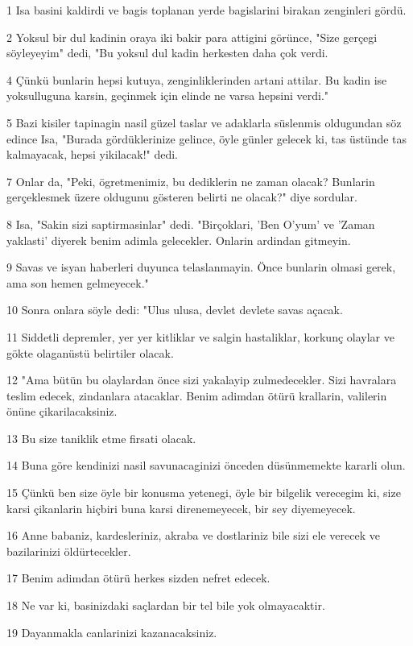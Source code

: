 \par 1 Isa basini kaldirdi ve bagis toplanan yerde bagislarini birakan zenginleri gördü.
\par 2 Yoksul bir dul kadinin oraya iki bakir para attigini görünce, "Size gerçegi söyleyeyim" dedi, "Bu yoksul dul kadin herkesten daha çok verdi.
\par 4 Çünkü bunlarin hepsi kutuya, zenginliklerinden artani attilar. Bu kadin ise yoksulluguna karsin, geçinmek için elinde ne varsa hepsini verdi."
\par 5 Bazi kisiler tapinagin nasil güzel taslar ve adaklarla süslenmis oldugundan söz edince Isa, "Burada gördüklerinize gelince, öyle günler gelecek ki, tas üstünde tas kalmayacak, hepsi yikilacak!" dedi.
\par 7 Onlar da, "Peki, ögretmenimiz, bu dediklerin ne zaman olacak? Bunlarin gerçeklesmek üzere oldugunu gösteren belirti ne olacak?" diye sordular.
\par 8 Isa, "Sakin sizi saptirmasinlar" dedi. "Birçoklari, 'Ben O'yum' ve 'Zaman yaklasti' diyerek benim adimla gelecekler. Onlarin ardindan gitmeyin.
\par 9 Savas ve isyan haberleri duyunca telaslanmayin. Önce bunlarin olmasi gerek, ama son hemen gelmeyecek."
\par 10 Sonra onlara söyle dedi: "Ulus ulusa, devlet devlete savas açacak.
\par 11 Siddetli depremler, yer yer kitliklar ve salgin hastaliklar, korkunç olaylar ve gökte olaganüstü belirtiler olacak.
\par 12 "Ama bütün bu olaylardan önce sizi yakalayip zulmedecekler. Sizi havralara teslim edecek, zindanlara atacaklar. Benim adimdan ötürü krallarin, valilerin önüne çikarilacaksiniz.
\par 13 Bu size taniklik etme firsati olacak.
\par 14 Buna göre kendinizi nasil savunacaginizi önceden düsünmemekte kararli olun.
\par 15 Çünkü ben size öyle bir konusma yetenegi, öyle bir bilgelik verecegim ki, size karsi çikanlarin hiçbiri buna karsi direnemeyecek, bir sey diyemeyecek.
\par 16 Anne babaniz, kardesleriniz, akraba ve dostlariniz bile sizi ele verecek ve bazilarinizi öldürtecekler.
\par 17 Benim adimdan ötürü herkes sizden nefret edecek.
\par 18 Ne var ki, basinizdaki saçlardan bir tel bile yok olmayacaktir.
\par 19 Dayanmakla canlarinizi kazanacaksiniz.
